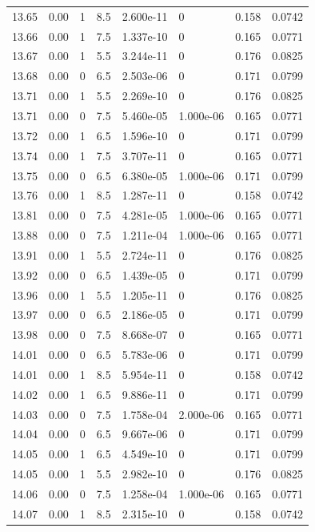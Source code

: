 \documentclass[preview]{standalone}
\begin{document}
{{{{{{{{{{{{{{{{\begin{tabular}{L{1.2cm}C{1.2cm} C{0.3cm}C{0.5cm} C{1.4cm}C{1.4cm} C{1.4cm}C{1.4cm}}
  13.65  &  0.00  & 1     & 8.5 &  2.600e-11  & 0  & 0.158 &  0.0742   \\ 
  13.66  &  0.00  & 1     & 7.5 &  1.337e-10  & 0  & 0.165 &  0.0771   \\ 
  13.67  &  0.00  & 1     & 5.5 &  3.244e-11  & 0  & 0.176 &  0.0825   \\ 
  13.68  &  0.00  & 0     & 6.5 &  2.503e-06  & 0  & 0.171 &  0.0799   \\ 
  13.71  &  0.00  & 1     & 5.5 &  2.269e-10  & 0  & 0.176 &  0.0825   \\ 
  13.71  &  0.00  & 0     & 7.5 &  5.460e-05  & 1.000e-06  & 0.165 &  0.0771   \\ 
  13.72  &  0.00  & 1     & 6.5 &  1.596e-10  & 0  & 0.171 &  0.0799   \\ 
  13.74  &  0.00  & 1     & 7.5 &  3.707e-11  & 0  & 0.165 &  0.0771   \\ 
  13.75  &  0.00  & 0     & 6.5 &  6.380e-05  & 1.000e-06  & 0.171 &  0.0799   \\ 
  13.76  &  0.00  & 1     & 8.5 &  1.287e-11  & 0  & 0.158 &  0.0742   \\ 
  13.81  &  0.00  & 0     & 7.5 &  4.281e-05  & 1.000e-06  & 0.165 &  0.0771   \\ 
  13.88  &  0.00  & 0     & 7.5 &  1.211e-04  & 1.000e-06  & 0.165 &  0.0771   \\ 
  13.91  &  0.00  & 1     & 5.5 &  2.724e-11  & 0  & 0.176 &  0.0825   \\ 
  13.92  &  0.00  & 0     & 6.5 &  1.439e-05  & 0  & 0.171 &  0.0799   \\ 
  13.96  &  0.00  & 1     & 5.5 &  1.205e-11  & 0  & 0.176 &  0.0825   \\ 
  13.97  &  0.00  & 0     & 6.5 &  2.186e-05  & 0  & 0.171 &  0.0799   \\ 
  13.98  &  0.00  & 0     & 7.5 &  8.668e-07  & 0  & 0.165 &  0.0771   \\ 
  14.01  &  0.00  & 0     & 6.5 &  5.783e-06  & 0  & 0.171 &  0.0799   \\ 
  14.01  &  0.00  & 1     & 8.5 &  5.954e-11  & 0  & 0.158 &  0.0742   \\ 
  14.02  &  0.00  & 1     & 6.5 &  9.886e-11  & 0  & 0.171 &  0.0799   \\ 
  14.03  &  0.00  & 0     & 7.5 &  1.758e-04  & 2.000e-06  & 0.165 &  0.0771   \\ 
  14.04  &  0.00  & 0     & 6.5 &  9.667e-06  & 0  & 0.171 &  0.0799   \\ 
  14.05  &  0.00  & 1     & 6.5 &  4.549e-10  & 0  & 0.171 &  0.0799   \\ 
  14.05  &  0.00  & 1     & 5.5 &  2.982e-10  & 0  & 0.176 &  0.0825   \\ 
  14.06  &  0.00  & 0     & 7.5 &  1.258e-04  & 1.000e-06  & 0.165 &  0.0771   \\ 
  14.07  &  0.00  & 1     & 8.5 &  2.315e-10  & 0  & 0.158 &  0.0742   \\ 
\hline 
\end{tabular} 

}}}}}}}}}}}}}}}}
\end{document}
